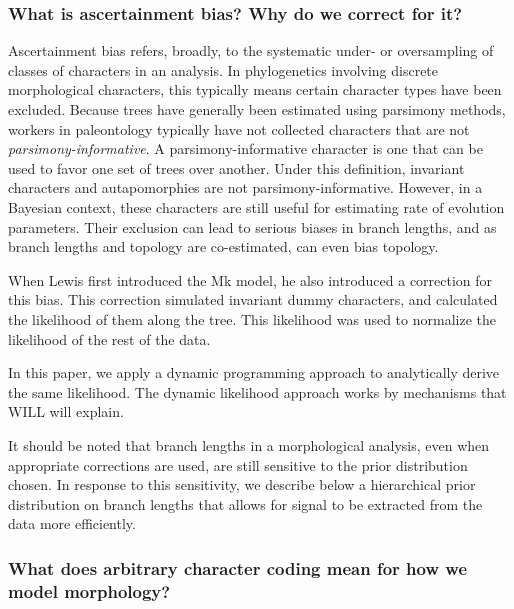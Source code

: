 \documentclass[]{article}
\begin{document}
	\subsubsection{What is ascertainment bias? Why do we correct for it?}
	
	Ascertainment bias refers, broadly, to the systematic under- or oversampling of classes of characters in an analysis.
	In phylogenetics involving discrete morphological characters, this typically means certain character types have been excluded.
	Because trees have generally been estimated using parsimony methods, workers in paleontology typically have not collected characters that are not \textit{parsimony-informative}.
	A parsimony-informative character is one that can be used to favor one set of trees over another.
	Under this definition, invariant characters and autapomorphies are not parsimony-informative. 
	However, in a Bayesian context, these characters are still useful for estimating rate of evolution parameters.
	Their exclusion can lead to serious biases in branch lengths, and as branch lengths and topology are co-estimated, can even bias topology. \par
	When Lewis first introduced the Mk model, he also introduced a correction for this bias.
	This correction simulated invariant dummy characters, and calculated the likelihood of them along the tree. 
	This likelihood was used to normalize the likelihood of the rest of the data. \par
	In this paper, we apply a dynamic programming
	approach to analytically derive the same likelihood.
	The dynamic likelihood approach works by mechanisms that WILL will explain. \par
	It should be noted that branch lengths in a morphological analysis, even when appropriate corrections are used, are still sensitive to the prior distribution chosen. 
	In response to this sensitivity, we describe below a hierarchical prior distribution on branch lengths that allows for signal to be extracted from the data more efficiently. \par
	
	
	\subsubsection{What does arbitrary character coding mean for how we model morphology?}
	
\end{document}
